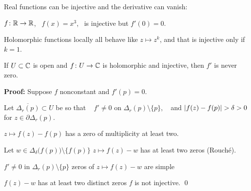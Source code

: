 \documentclass[10pt,aspectratio=169]{beamer}
\begin{document}
\begin{frame}
Real functions can be injective and the derivative can vanish:

$f \colon {\mathbb{R}} \to {\mathbb{R}}$, ~$f(x) = x^3$, ~is injective but $f'(0) = 0$.

\medskip
\pause

Holomorphic functions locally all behave like
$z \mapsto z^k$, and that is injective only if $k=1$.

\medskip
\pause

\begin{lemma}
If $U \subset {\mathbb{C}}$ is open and $f \colon U \to {\mathbb{C}}$ is holomorphic and injective, then
$f'$ is never zero.
\end{lemma}

\pause

\textbf{Proof:}
Suppose $f$ nonconstant and $f'(p) = 0$.

\pause
Let $\overline{\Delta_r(p)} \subset U$
be so that ~ $f' \not= 0$ on $\Delta_r(p) \setminus
\{ p \}$, ~
and $\lvert {f(z)-f(p)} \rvert > \delta > 0$ for $z \in \partial
\Delta_r(p)$.

\medskip
\pause

$z \mapsto f(z) - f(p)$ has a zero of multiplicity at least
two.

\pause
\medskip

Let $w \in \Delta_{\delta}\bigl(f(p)\bigr) \setminus \bigl\{ f(p) \bigr\}$
\pause
\wthus
$z \mapsto f(z)-w$ has at least two zeros (Rouch\'e).

\pause
\medskip

$f'\not=0$ in $\Delta_r(p) \setminus \{ p \}$
\pause
\wthus
zeros of $z \mapsto f(z)-w$ are simple

\pause
\thus \quad
$f(z)-w$ has at least two distinct zeros
\pause
\wthus
$f$ is not injective.  \qed
\end{frame}
\end{document}
